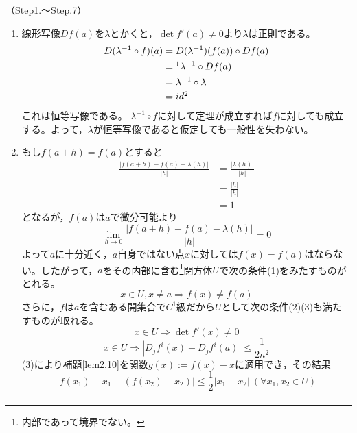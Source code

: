 \documentclass[dvipdfmx,a4j,10pt]{jsarticle}
\makeatletter
\theoremstyle{mystyle1}
\theoremstyle{mystyle2}
\renewenvironment{proof}[1][\proofname]{\par
  \pushQED{\qed}%
  \normalfont
  \topsep6\p@\@plus6\p@ \trivlist
  \item[\hskip\labelsep{\bfseries\sffamily #1}]\ignorespaces
}{%
  \popQED\endtrivlist\@endpefalse
}
\renewcommand\proofname{証明}
\makeatother
\begin{document}
\begin{proof}（Step1.〜Step.7）
	\begin{enumerate}\renewcommand{\labelenumi}{Step\arabic{enumi}.}
	\item 線形写像$Df(a)$を$\lambda$とかくと，$\det f'(a)\neq0$より$\lambda$は正則である。
	\[
	\begin{split}
	D(\lambda^{-1}\circ f)(a)
	&=D(\lambda^{-1})(f(a))\circ Df(a) \\
	&=\footnotemark\lambda^{-1}\circ Df(a) \\
	&=\lambda^{-1}\circ\lambda \\
	&=id\footnotemark
	\end{split}
	\]
	これは恒等写像である。
	$\lambda^{-1}\circ f$に対して定理が成立すれば$f$に対しても成立する。よって，$\lambda$が恒等写像であると仮定しても一般性を失わない。
	\item もし$f(a+h)=f(a)$とすると
	\[
	\begin{split}
	\frac{|f(a+h)-f(a)-\lambda(h)|}{|h|}&=\frac{|\lambda(h)|}{|h|}\\
	&=\frac{|h|}{|h|}\\
	&=1
	\end{split}
	\]
	となるが，$f(a)$は$a$で微分可能より
	\[
	\lim_{h\to0}\frac{|f(a+h)-f(a)-\lambda(h)|}{|h|}=0
	\]
	よって$a$に十分近く，$a$自身ではない点$x$に対しては$f(x)=f(a)$はならない。したがって，$a$をその内部に含む\footnote{内部であって境界でない。}閉方体$U$で次の条件(1)をみたすものがとれる。　
	\setcounter{equation}{0}
	\begin{equation}
		x\in U,x\neq a\Rightarrow f(x)\neq f(a)
	\end{equation}
	さらに，$f$は$a$を含むある開集合で$C^1$級だから$U$として次の条件(2)(3)も満たすものが取れる。
	\begin{equation}
		x\in U\Rightarrow \det f'(x)\neq0
	\end{equation}
	\begin{equation}
	x\in U\Rightarrow|D_jf^i(x)-D_jf^i(a)|\leq\frac{1}{2n^2}
	\end{equation}
	(3)により補題\ref{lem2.10}を関数$g(x):=f(x)-x$に適用でき，その結果
	\[
	|f(x_1)-x_1-(f(x_2)-x_2)|\leq\frac{1}{2}|x_1-x_2|\ (\forall x_1,x_2\in U)
	\] \footnotemark
	\[
	\begin{split}

\end{split}\]
\end{enumerate}
\end{proof}
\end{document}
